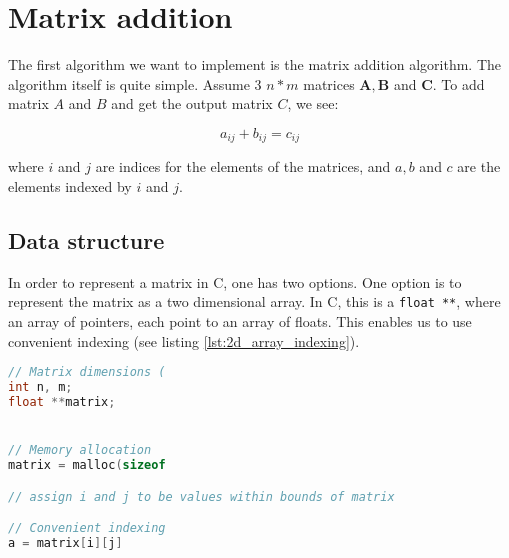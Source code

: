 \section{Matrix addition}

The first algorithm we want to implement is the matrix addition algorithm. The algorithm itself is quite simple. Assume 3 \(n * m\) matrices \(\mathbf{A}, \mathbf{B}\) and \(\mathbf{C}\). To add matrix \(A\) and \(B\) and get the output matrix \(C\), we see:

\[a_{ij} + b_{ij} = c_{ij}\]

where \(i\) and \(j\) are indices for the elements of the matrices, and \(a, b\) and \(c\) are the elements indexed by \(i\) and \(j\).\cite{wiki:matrixAddition}

\subsection{Data structure}

In order to represent a matrix in C, one has two options. One option is to represent the matrix as a two dimensional array. In C, this is a \texttt{float **}, where an array of pointers, each point to an array of floats. This enables us to use convenient indexing (see listing \ref{lst:2d_array_indexing}).

\begin{lstlisting}[language=C, caption={Indexing of a float **}, label={lst:2d_array_indexing}]
// Matrix dimensions (
int n, m;
float **matrix;


// Memory allocation
matrix = malloc(sizeof

// assign i and j to be values within bounds of matrix

// Convenient indexing
a = matrix[i][j]
\end{lstlisting}

